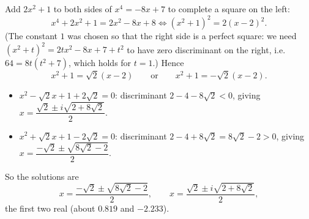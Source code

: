 Add $2x^2+1$ to both sides of $x^4=-8x+7$ to complete a square on the left:
\[
x^4+2x^2+1=2x^2-8x+8\iff (x^2+1)^2=2(x-2)^2 .
\]
(The constant $1$ was chosen so that the right side is a perfect square: we need $(x^2+t)^2=2tx^2-8x+7+t^2$ to have zero discriminant on the right, i.e. $64=8t(t^2+7)$, which holds for $t=1$.) Hence
\[
x^2+1=\sqrt2(x-2)\qquad\text{or}\qquad x^2+1=-\sqrt2(x-2).
\]
\begin{itemize}
\item $x^2-\sqrt2x+1+2\sqrt2=0$: discriminant $2-4-8\sqrt2<0$, giving $x=\dfrac{\sqrt2\pm i\sqrt{2+8\sqrt2}}{2}$.
\item $x^2+\sqrt2x+1-2\sqrt2=0$: discriminant $2-4+8\sqrt2=8\sqrt2-2>0$, giving $x=\dfrac{-\sqrt2\pm\sqrt{8\sqrt2-2}}{2}$.
\end{itemize}
So the solutions are
\[
\boxed{x=\dfrac{-\sqrt2\pm\sqrt{8\sqrt2-2}}{2},\qquad x=\dfrac{\sqrt2\pm i\sqrt{2+8\sqrt2}}{2}},
\]
the first two real (about $0.819$ and $-2.233$).
